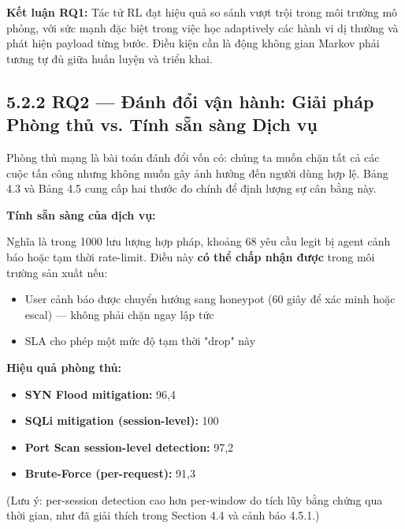 \documentclass[12pt,a4paper,twoside]{report}
\begin{document}
{{{{{{{{{{\textbf{Kết luận RQ1:} Tác tử RL đạt hiệu quả so sánh vượt trội trong môi trường mô phỏng, với sức mạnh đặc biệt trong việc học adaptively các hành vi dị thường và phát hiện payload từng bước. Điều kiện cần là động không gian Markov phải tương tự đủ giữa huấn luyện và triển khai.


\subsection{5.2.2 RQ2 — Đánh đổi vận hành: Giải pháp Phòng thủ vs. Tính sẵn sàng Dịch vụ}

Phòng thủ mạng là bài toán đánh đổi vốn có: chúng ta muốn chặn tất cả các cuộc tấn công nhưng không muốn gây ảnh hưởng đến người dùng hợp lệ. Bảng 4.3 và Bảng 4.5 cung cấp hai thước đo chính để định lượng sự cân bằng này.

\textbf{Tính sẵn sàng của dịch vụ:}

Nghĩa là trong 1000 lưu lượng hợp pháp, khoảng 68 yêu cầu legit bị agent cảnh báo hoặc tạm thời rate-limit. Điều này \textbf{có thể chấp nhận được} trong môi trường sản xuất nếu:
\begin{itemize}
\item User cảnh báo được chuyển hướng sang honeypot (60 giây để xác minh hoặc escal) — không phải chặn ngay lập tức
\item SLA cho phép một mức độ tạm thời "drop" này
\end{itemize}

\textbf{Hiệu quả phòng thủ:}
\begin{itemize}
\item \textbf{SYN Flood mitigation:} 96,4%
\item \textbf{SQLi mitigation (session-level):} 100%
\item \textbf{Port Scan session-level detection:} 97,2%
\item \textbf{Brute-Force (per-request):} 91,3%
\end{itemize}

(Lưu ý: per-session detection cao hơn per-window do tích lũy bằng chứng qua thời gian, như đã giải thích trong Section 4.4 và cảnh báo 4.5.1.)

}}}}}}}}}}
\end{document}
